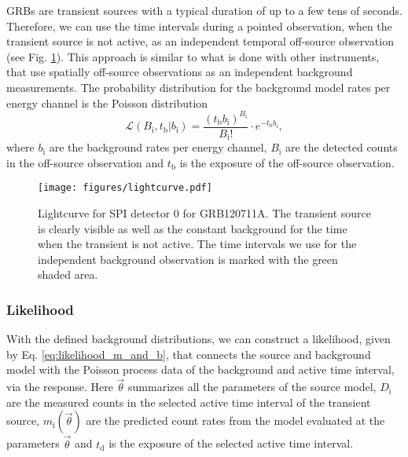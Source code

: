 \documentclass[twocolumn,traditabstract]{aa}
\begin{document}
GRBs are transient sources with a typical duration of up to a few tens of seconds. Therefore, we can use the time intervals during a pointed observation, when the transient source is not active, as an independent temporal off-source observation (see Fig. \ref{fig:lightcurve}). This approach is similar to what is done with other instruments, that use spatially off-source observations as an independent background measurements. The probability distribution for the background model rates per energy channel is the Poisson distribution
\begin{equation}
	\mathcal{L}(B_{\mathrm{i}}, t_{\mathrm{b}}|b_{\mathrm{i}})=\frac{(t_{\mathrm{b}} b_{\mathrm{i}})^{B_{\mathrm{i}}}}{B_{\mathrm{i}}!}\cdot e^{-t_{\mathrm{b}} b_{\mathrm{i}}},
  \label{eq:poisson_bkg}
\end{equation}
where $b_{\mathrm{i}}$ are the background rates per energy channel, $B_{\mathrm{i}}$ are the detected counts in the off-source observation and $t_{\mathrm{b}}$ is the exposure of the off-source observation.
\begin{figure}
    \begin{centering}
        \texttt{[image: figures/lightcurve.pdf]}
        \caption{Lightcurve for SPI detector 0 for GRB120711A. The transient source is clearly visible as well as the constant background for the time when the transient is not active. The time intervals we use for the independent background observation is marked with the green shaded area.}
        \label{fig:lightcurve}
    \end{centering}
\end{figure}



\subsubsection{Likelihood}

With the defined background distributions, we can construct a likelihood, given by Eq. \ref{eq:likelihood_m_and_b}, that connects the source and background model with the Poisson process data of the background and active time interval, via the response. Here $\vec{\theta}$ summarizes all the parameters of the source model, $D_{\mathrm{i}}$ are the measured counts in the selected active time interval of the transient source, $m_{\mathrm{i}}(\vec{\theta})$ are the predicted count rates from the model evaluated at the parameters $\vec{\theta}$ and $t_{\mathrm{d}}$ is the exposure of the selected active time interval.
\end{document}
